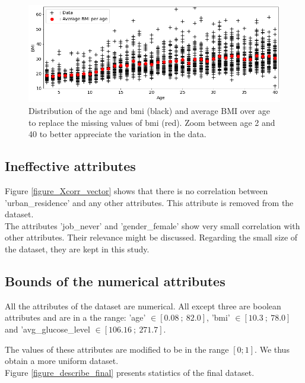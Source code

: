 \begin{figure}[H]
\centering
\includegraphics[scale=0.5]{../figures/plot_age_bmi_replaced.png}
\caption{Distribution of the age and bmi (black) and average BMI over age to replace the missing values of bmi (red). Zoom between age 2 and 40 to better appreciate the variation in the data.}
\label{figure_age_bmi_replaced}
\end{figure}

\subsection{Ineffective attributes}
Figure \ref{figure_Xcorr_vector} shows that there is no correlation between 'urban\_residence' and 
any other attributes. This attribute is removed from the dataset.\\

The attributes 'job\_never' and 'gender\_female' show very small correlation with other attributes. 
Their relevance might be discussed. Regarding the small size of the dataset, they are kept in this 
study.

\subsection{Bounds of the numerical attributes}
All the attributes of the dataset are numerical. All except three are boolean attributes and are in 
a the range: 'age' $\in [0.08~;~82.0]$, 'bmi' $\in [10.3~;~78.0]$ and 'avg\_glucose\_level 
$\in [106.16~;~271.7]$.

The values of these attributes are modified to be in the range $[0;1]$. We thus obtain a more uniform 
dataset.\\

Figure \ref{figure_describe_final} presents statistics of the final dataset. 

